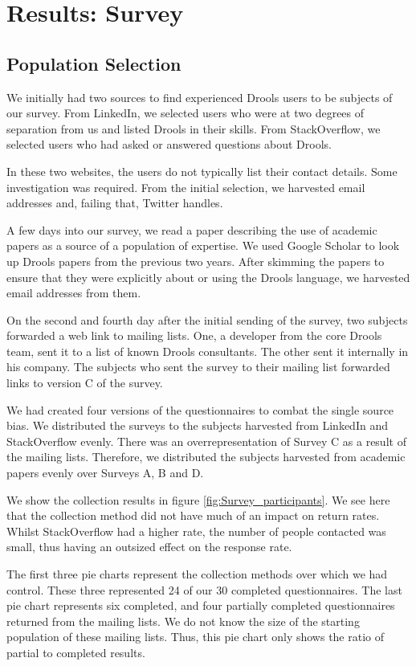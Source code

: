 \section{Results: Survey}
\label{section:Results_Survey}

\subsection{Population Selection}
We initially had two sources to find experienced Drools users to be subjects of our survey.
From LinkedIn, we selected users who were at two degrees of separation from us and listed Drools in their skills.
From StackOverflow, we selected users who had asked or answered questions about Drools.

In these two websites, the users do not typically list their contact details.
Some investigation was required.
From the initial selection, we harvested email addresses and, failing that, Twitter handles.

A few days into our survey, we read a paper describing the use of academic papers as a source of a population of expertise.
We used Google Scholar to look up Drools papers from the previous two years.
After skimming the papers to ensure that they were explicitly about or using the Drools language, we harvested email addresses from them.

On the second and fourth day after the initial sending of the survey, two subjects forwarded a web link to mailing lists.
One, a developer from the core Drools team, sent it to a list of known Drools consultants.
The other sent it internally in his company.
The subjects who sent the survey to their mailing list forwarded links to version C of the survey.

We had created four versions of the questionnaires to combat the single source bias.
We distributed the surveys to the subjects harvested from LinkedIn and StackOverflow evenly.
There was an overrepresentation of Survey C as a result of the mailing lists.
Therefore, we distributed the subjects harvested from academic papers evenly over Surveys A, B and D.

We show the collection results in figure \ref{fig:Survey_participants}.
We see here that the collection method did not have much of an impact on return rates.
Whilst StackOverflow had a higher rate, the number of people contacted was small, thus having an outsized effect on the response rate.

The first three pie charts represent the collection methods over which we had control.
These three represented 24 of our 30 completed questionnaires.
The last pie chart represents six completed, and four partially completed questionnaires returned from the mailing lists.
We do not know the size of the starting population of these mailing lists. 
Thus, this pie chart only shows the ratio of partial to completed results.

